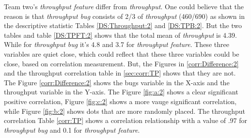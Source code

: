 \documentclass[UKenglish]{ifimaster}  %
\begin{document}
Team two's \textit{throughput feature} differ from \textit{throughput}. One could believe that the reason is that \textit{throughput bug} consists of 2/3 of \textit{throughput} (460/690) as shown in the descriptive statistic Tables \ref{DS:Throughput:2} and \ref{DS:TPB:2}. But the two tables and table \ref{DS:TPFT:2} shows that the total mean of \textit{throughput} is 4.39. While for \textit{throughput bug} it's 4.8 and 3.7 for \textit{throughput feature}. These three variables are quiet close, which could reflect that these three variables could be close, based on correlation measurement. But, the Figures in \ref{corr:Difference:2} and the throughput correlation table in \ref{sec:corr:TP} shows that they are not. The Figure \ref{corr:Difference:2} shows the bugs variable in the X-axis and the throughput variable in the Y-axis. The Figure \ref{fig:a:2} shows a clear significant positive correlation, Figure \ref{fig:c:2} shows a more vauge significant correlation, while Figure \ref{fig:b:2} shows dots that are more randomly placed. The throughput correlation Table \ref{corr:TP} shows a correlation relationship with a value of .97 for \textit{throughput bug} and  0.1 for \textit{throughput feature}.
\end{document}
